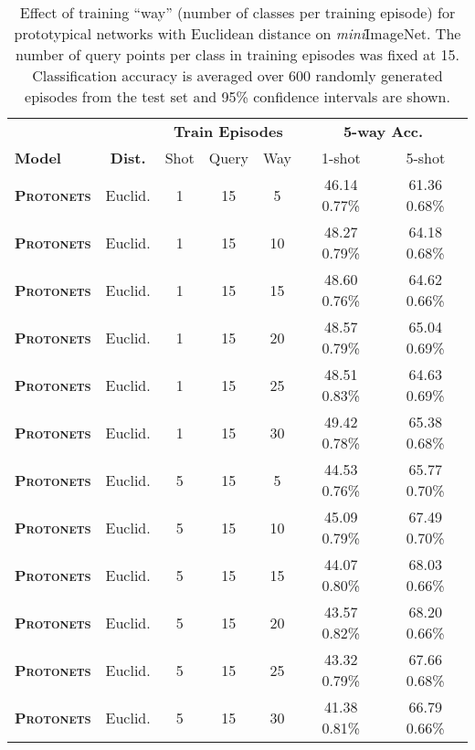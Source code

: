 \documentclass{article}
\def\abovestrut#1{\rule[0in]{0in}{#1}\ignorespaces}
\def\belowstrut#1{\rule[-#1]{0in}{#1}\ignorespaces}
\def\abovespace{\abovestrut{0.20in}}
\def\belowspace{\belowstrut{0.10in}}
\begin{document}
\begin{table*}[ht]
\caption{Effect of training ``way'' (number of classes per training episode) for prototypical networks with Euclidean distance on \textit{mini}ImageNet. The number of query points per class in training episodes was fixed at 15. Classification accuracy is averaged over 600 randomly generated episodes from the test set and 95\% confidence intervals are shown.}
\label{tab:miniImagenetway}
\begin{center}
\begin{small}
\begin{tabular}{lcccccc}
\hline
\abovespace
&&\multicolumn{3}{c}{\textbf{Train Episodes}} & \multicolumn{2}{c}{\textbf{5-way Acc.}} \\
\belowspace
\textbf{Model} & \textbf{Dist.} & Shot & Query & Way & 1-shot & 5-shot \\
\hline
\abovespace
\textbf{\textsc{Protonets}} & Euclid. & 1 & 15 & 5  & 46.14  0.77\% & 61.36  0.68\% \\
\textbf{\textsc{Protonets}} & Euclid. & 1 & 15 & 10 & 48.27  0.79\% & 64.18  0.68\% \\
\textbf{\textsc{Protonets}} & Euclid. & 1 & 15 & 15 & 48.60  0.76\% & 64.62  0.66\% \\
\textbf{\textsc{Protonets}} & Euclid. & 1 & 15 & 20 & 48.57  0.79\% & 65.04  0.69\% \\
\textbf{\textsc{Protonets}} & Euclid. & 1 & 15 & 25 & 48.51  0.83\% & 64.63  0.69\% \\
\belowspace
\textbf{\textsc{Protonets}} & Euclid. & 1 & 15 & 30 & 49.42  0.78\% & 65.38  0.68\% \\

\hline

\abovespace
\textbf{\textsc{Protonets}} & Euclid. & 5 & 15 & 5  & 44.53  0.76\% & 65.77  0.70\% \\
\textbf{\textsc{Protonets}} & Euclid. & 5 & 15 & 10 & 45.09  0.79\% & 67.49  0.70\% \\
\textbf{\textsc{Protonets}} & Euclid. & 5 & 15 & 15 & 44.07  0.80\% & 68.03  0.66\% \\
\textbf{\textsc{Protonets}} & Euclid. & 5 & 15 & 20 & 43.57  0.82\% & 68.20  0.66\% \\
\textbf{\textsc{Protonets}} & Euclid. & 5 & 15 & 25 & 43.32  0.79\% & 67.66  0.68\% \\
\belowspace
\textbf{\textsc{Protonets}} & Euclid. & 5 & 15 & 30 & 41.38  0.81\% & 66.79  0.66\% \\
\hline
\end{tabular}
\end{small}
\end{center}
\end{table*}
\end{document}
